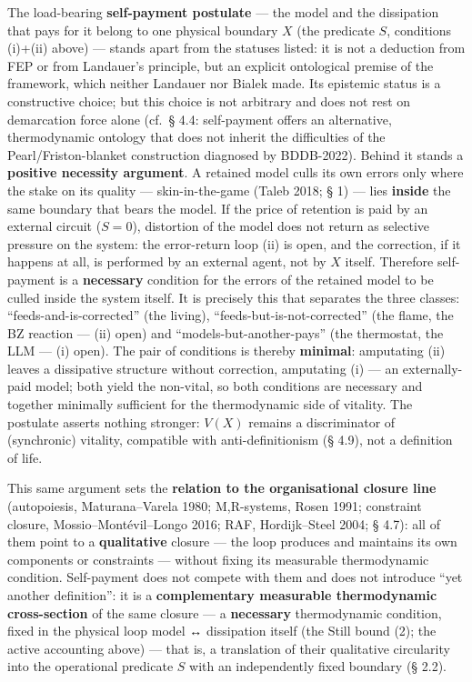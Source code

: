 \documentclass[pdflatex,sn-mathphys-ay]{sn-jnl}
\begin{document}
The load-bearing \textbf{self-payment postulate} --- the model and the dissipation that pays for it belong to one physical boundary \(X\) (the predicate \(S\), conditions (i)+(ii) above) --- stands apart from the statuses listed: it is not a deduction from FEP or from Landauer's principle, but an explicit ontological premise of the framework, which neither Landauer nor Bialek made. Its epistemic status is a constructive choice; but this choice is not arbitrary and does not rest on demarcation force alone (cf.~§ 4.4: self-payment offers an alternative, thermodynamic ontology that does not inherit the difficulties of the Pearl/Friston-blanket construction diagnosed by BDDB-2022). Behind it stands a \textbf{positive necessity argument}. A retained model culls its own errors only where the stake on its quality --- skin-in-the-game (Taleb 2018; § 1) --- lies \textbf{inside} the same boundary that bears the model. If the price of retention is paid by an external circuit (\(S = 0\)), distortion of the model does not return as selective pressure on the system: the error-return loop (ii) is open, and the correction, if it happens at all, is performed by an external agent, not by \(X\) itself. Therefore self-payment is a \textbf{necessary} condition for the errors of the retained model to be culled inside the system itself. It is precisely this that separates the three classes: ``feeds-and-is-corrected'' (the living), ``feeds-but-is-not-corrected'' (the flame, the BZ reaction --- (ii) open) and ``models-but-another-pays'' (the thermostat, the LLM --- (i) open). The pair of conditions is thereby \textbf{minimal}: amputating (ii) leaves a dissipative structure without correction, amputating (i) --- an externally-paid model; both yield the non-vital, so both conditions are necessary and together minimally sufficient for the thermodynamic side of vitality. The postulate asserts nothing stronger: \(V(X)\) remains a discriminator of (synchronic) vitality, compatible with anti-definitionism (§ 4.9), not a definition of life.

This same argument sets the \textbf{relation to the organisational closure line} (autopoiesis, Maturana--Varela 1980; M,R-systems, Rosen 1991; constraint closure, Mossio--Montévil--Longo 2016; RAF, Hordijk--Steel 2004; § 4.7): all of them point to a \textbf{qualitative} closure --- the loop produces and maintains its own components or constraints --- without fixing its measurable thermodynamic condition. Self-payment does not compete with them and does not introduce ``yet another definition'': it is a \textbf{complementary measurable thermodynamic cross-section} of the same closure --- a \textbf{necessary} thermodynamic condition, fixed in the physical loop model ↔ dissipation itself (the Still bound (2); the active accounting above) --- that is, a translation of their qualitative circularity into the operational predicate \(S\) with an independently fixed boundary (§ 2.2).
\end{document}

